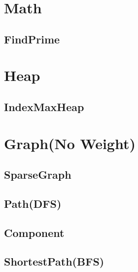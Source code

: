 \section{Math}
    \subsection{FindPrime}
        

\section{Heap}
    \subsection{IndexMaxHeap}
        

\section{Graph(No Weight)}
    \subsection{SparseGraph}
        
    \subsection{Path(DFS)}
        
    \subsection{Component}
        
    \subsection{ShortestPath(BFS)}
        